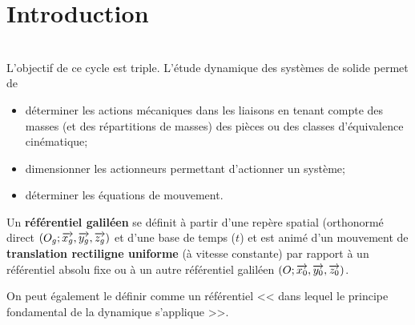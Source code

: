 \documentclass[10pt,fleqn]{article} %
\begin{document}

\setlength{\columnseprule}{.1pt}

\vspace{2cm}
\pagestyle{fancy}
\thispagestyle{plain}


\section{Introduction}
\begin{obj} ~\\
L'objectif de ce cycle est triple. L'étude dynamique des systèmes de solide permet de 
\begin{itemize}
\item déterminer les actions mécaniques dans les liaisons en tenant compte des masses (et des répartitions de masses) des pièces ou des classes d'équivalence cinématique;
\item dimensionner les actionneurs permettant d'actionner un système; 
\item déterminer les équations de mouvement.
\end{itemize}
\end{obj}


\begin{definition}
Un \textbf{référentiel galiléen} se définit à partir d'une repère spatial (orthonormé direct $\left(O_g;\overrightarrow{x_g},\overrightarrow{y_g},\overrightarrow{z_g} \right)$ et d'une base de temps ($t$) et est animé d'un mouvement de \textbf{translation rectiligne uniforme} (à vitesse constante) par rapport à un référentiel absolu fixe ou à un autre référentiel galiléen $\left(O;\overrightarrow{x_0},\overrightarrow{y_0},\overrightarrow{z_0} \right)$. 

On peut également le définir comme un référentiel << dans lequel le principe fondamental de la dynamique s'applique >>.
\end{definition}
\end{document}
